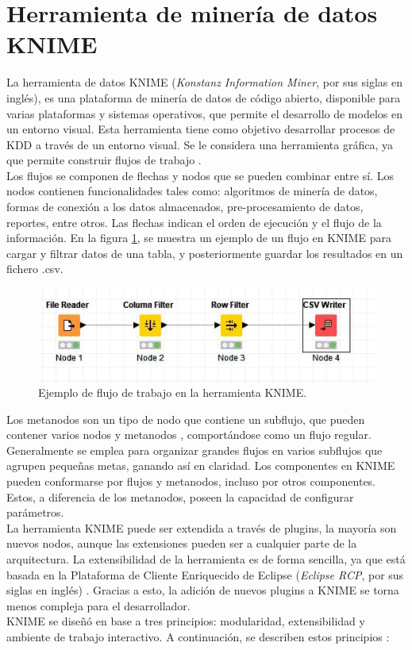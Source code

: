 \section{Herramienta de minería de datos KNIME}

La herramienta de datos KNIME (\textit{Konstanz Information Miner}, por sus siglas en inglés), es una plataforma de minería de datos de código abierto, disponible para varias plataformas y sistemas operativos, que permite el desarrollo de modelos en un entorno visual. Esta herramienta tiene como objetivo desarrollar procesos de KDD a través de un entorno visual. Se le considera una herramienta gráfica, ya que permite construir flujos de trabajo \citep{knime2023}. \\
Los flujos se componen de flechas y nodos que se pueden combinar entre sí. Los nodos contienen funcionalidades tales como: algoritmos de minería de datos, formas de conexión a los datos almacenados, pre-procesamiento de datos, reportes, entre otros. Las flechas indican el orden de ejecución y el flujo de la información. En la figura \ref{fig:ejemploworkflow}, se muestra un ejemplo de un flujo en KNIME para cargar y filtrar datos de una tabla, y posteriormente guardar los resultados en un fichero .csv. 
\begin{figure}[H]
	\centering
	\includegraphics[width=0.9\linewidth]{figuras/capi 1/ejemplo_workflow}
	\caption{Ejemplo de flujo de trabajo en la herramienta KNIME.}
	\label{fig:ejemploworkflow}
\end{figure}
Los metanodos son un tipo de nodo que contiene un subflujo, que pueden contener varios nodos y metanodos \citep{berthold2009knime}, comportándose como un flujo regular. Generalmente se emplea para organizar grandes flujos en varios subflujos que agrupen pequeñas metas, ganando así en claridad. Los componentes en KNIME pueden conformarse por flujos y metanodos, incluso por otros componentes. Estos, a diferencia de los metanodos, poseen la capacidad de configurar parámetros. \\
La herramienta KNIME puede ser extendida a través de plugins, la mayoría son nuevos nodos, aunque las extensiones pueden ser a cualquier parte de la arquitectura. La extensibilidad de la herramienta es de forma sencilla, ya que está basada en la Plataforma de Cliente Enriquecido de Eclipse (\textit{Eclipse RCP}, por sus siglas en inglés) \citep{berthold2009knime}. Gracias a esto, la adición de nuevos plugins a KNIME se torna menos compleja para el desarrollador. \\
KNIME se diseñó en base a tres principios: modularidad, extensibilidad y ambiente de trabajo interactivo. A continuación, se describen estos principios \citep{Lisandra2012}:

